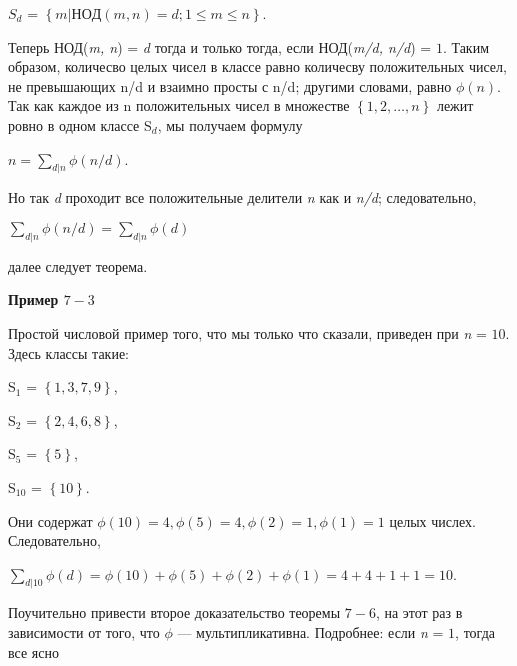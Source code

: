 \documentclass[12pt]{article}
\begin{document}
	\begin{center}
		$S_{d}$ = $\left\{m | НОД(m, n) = d; 1 \leq m \leq n\right\}$.	
	\end{center}
	
	
	Теперь НОД(\textit{m, n}) = \textit{d} тогда и только тогда, если  НОД(\textit{m/d, n/d}) = $1$. Таким образом, количесво целых чисел в классе равно количесву положительных чисел, не превышающих  n/d и взаимно просты с n/d; другими словами, равно $\phi(n)$. Так как каждое из n положительных чисел в множестве $\left\{1, 2, … , n\right\}$ лежит ровно в одном классе S$_d$, мы получаем формулу
	
	\begin{center}
		$n = \sum_{d|n}\phi(n/d)$.	
	\end{center}
	
	
	Но так \textit{d} проходит все положительные делители \textit{n} как и \textit{n/d}; следовательно, 
	
	\begin{center}
		$\sum_{d|n}\phi(\textit{n/d}) = \sum_{d|n}\phi(\textit{d})$	
	\end{center}
	
	
	далее следует теорема.
	
	\begin{flushleft}
		\textbf{Пример $7-3$}
	\end{flushleft}
	
	
	Простой числовой пример того, что мы только что сказали, приведен при \textit{n} = $10$. Здесь классы такие:
	
	\begin{center}
		S$_1$ = $\left\{1, 3, 7, 9\right\}$,
		
		S$_2$ = $\left\{2, 4, 6, 8\right\}$,
		
		S$_5$ = $\left\{5\right\}$,
		
		S$_{10}$ = $\left\{10\right\}$.	
	\end{center}				
	
	
	Они содержат $\phi(10) = 4, \phi(5) = 4, \phi(2) = 1, \phi(1) = 1$ целых числех. Следовательно, 
	
	\begin{center}
		$\sum_{d|10}\phi(\textit{d}) = \phi(10) + \phi(5) + \phi(2) + \phi(1) = 4 + 4 + 1 + 1 = 10$.	
	\end{center}
	
	
	Поучительно привести второе доказательство теоремы $7-6$, на этот раз в зависимости от того, что  $\phi$ — мультипликативна. Подробнее: если \textit{n} = $1$,  тогда все ясно 
	
\end{document}

